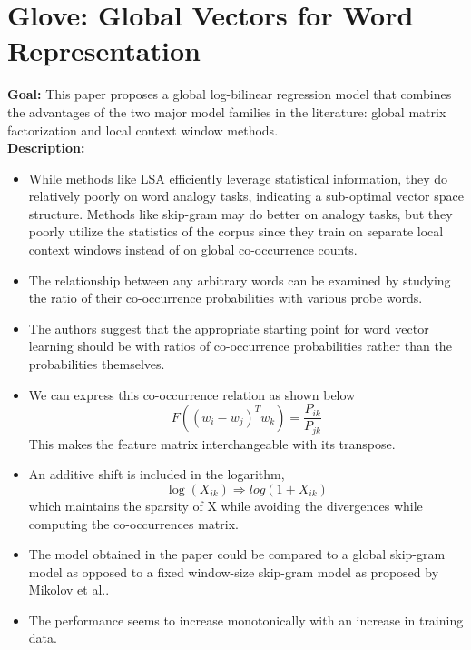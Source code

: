 \documentclass[11pt,a4paper]{article}
\begin{document}


\section{Glove: Global Vectors for Word Representation} %
\label{sec:glove_global_vectors_for_word_representation}

  \textbf{Goal:}
  This paper proposes a global log-bilinear regression model that combines the advantages of the two major model families in the literature: global matrix factorization and local context window methods\cite{pennington2014glove}.\\

  \textbf{Description:}
  \begin{itemize}
    \item
    While methods like LSA efficiently leverage statistical information, they do relatively poorly on word analogy tasks, indicating a sub-optimal vector space structure. Methods like skip-gram may do better on analogy tasks, but they poorly utilize the statistics of the corpus since they train on separate local context windows instead of on global co-occurrence counts.
    \item
    The relationship between any arbitrary words can be examined by studying the ratio of their co-occurrence probabilities with various probe words.
    \item
    The authors suggest that the appropriate starting point for word vector learning should be with ratios of co-occurrence probabilities rather than the probabilities themselves.
    \item
    We can express this co-occurrence relation as shown below
    $$F((w_i - w_j)^T w_k) = \frac{P_{ik}}{P_{jk}}$$
    This makes the feature matrix interchangeable with its transpose.
    \item
    An additive shift is included in the logarithm, $$\log(X_{ik}) \Rightarrow log(1 + X_{ik})$$ which maintains the sparsity of X while avoiding the divergences while computing the co-occurrences matrix.
    \item
    The model obtained in the paper could be compared to a global skip-gram model as opposed to a fixed window-size skip-gram model as proposed by Mikolov et al.\cite{mikolov2013efficient}.
    \item
    The performance seems to increase monotonically with an increase in training data.
  \end{itemize}
\end{document}
